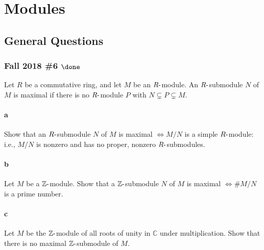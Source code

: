 \hypertarget{modules}{%
\section{Modules}\label{modules}}

\hypertarget{general-questions}{%
\subsection{General Questions}\label{general-questions}}

\hypertarget{fall-2018-6-done}{%
\subsubsection{\texorpdfstring{Fall 2018 \#6
\(\done\)}{Fall 2018 \#6 \textbackslash done}}\label{fall-2018-6-done}}

Let \(R\) be a commutative ring, and let \(M\) be an
\(R{\hbox{-}}\)module. An \(R{\hbox{-}}\)submodule \(N\) of \(M\) is
maximal if there is no \(R{\hbox{-}}\)module \(P\) with
\(N \subsetneq P \subsetneq M\).

\hypertarget{a-84}{%
\paragraph{a}\label{a-84}}

Show that an \(R{\hbox{-}}\)submodule \(N\) of \(M\) is maximal
\(\iff M /N\) is a simple \(R{\hbox{-}}\)module: i.e., \(M /N\) is
nonzero and has no proper, nonzero \(R{\hbox{-}}\)submodules.

\hypertarget{b-74}{%
\paragraph{b}\label{b-74}}

Let \(M\) be a \({\mathbb{Z}}{\hbox{-}}\)module. Show that a
\({\mathbb{Z}}{\hbox{-}}\)submodule \(N\) of \(M\) is maximal
\(\iff \#M /N\) is a prime number.

\hypertarget{c-48}{%
\paragraph{c}\label{c-48}}

Let \(M\) be the \({\mathbb{Z}}{\hbox{-}}\)module of all roots of unity
in \({\mathbb{C}}\) under multiplication. Show that there is no maximal
\({\mathbb{Z}}{\hbox{-}}\)submodule of \(M\).

